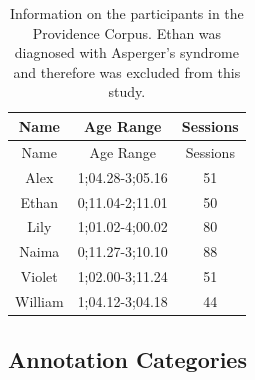 \documentclass[,man,floatsintext]{apa6}
\begin{document}
\begin{longtable}[]{@{}ccc@{}}
\caption{\label{tab:providence} Information on the participants in the Providence Corpus. Ethan was diagnosed with Asperger's syndrome and therefore was excluded from this study.}\tabularnewline
\toprule
Name & Age Range & Sessions\tabularnewline
\midrule
\endfirsthead
\toprule
Name & Age Range & Sessions\tabularnewline
\midrule
\endhead
Alex & 1;04.28-3;05.16 & 51\tabularnewline
Ethan & 0;11.04-2;11.01 & 50\tabularnewline
Lily & 1;01.02-4;00.02 & 80\tabularnewline
Naima & 0;11.27-3;10.10 & 88\tabularnewline
Violet & 1;02.00-3;11.24 & 51\tabularnewline
William & 1;04.12-3;04.18 & 44\tabularnewline
\bottomrule
\end{longtable}

\hypertarget{annotation-categories-1}{%
\subsection{Annotation Categories}\label{annotation-categories-1}}
\end{document}
